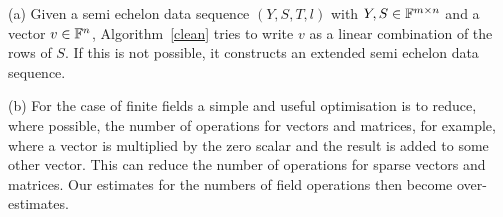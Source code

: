 \begin{Rem}\label{rem:cae}
(a) Given a semi echelon data sequence $(Y,S,T,l)$ with $Y,S \in \mathbb{F}^{m
\times n}$ and a vector $v \in \mathbb{F}^n$, Algorithm~\ref{clean} tries to
write $v$ as a linear combination of the rows of $S$. If this is not
possible, it constructs an extended semi echelon data sequence.

\medskip\noindent
(b) For the case of finite fields a simple and useful
optimisation is to reduce, where possible, the number of operations for vectors and matrices, 
for example, where a vector is multiplied by the zero scalar and the
result is added to some other vector. This can reduce the number of operations for
sparse vectors and matrices. Our estimates for the numbers of field operations then become
over-estimates.
\end{Rem}

